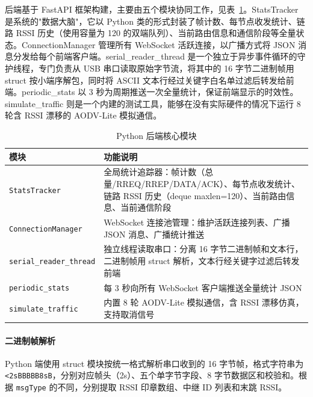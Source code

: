 \documentclass[12pt,a4paper]{ctexart}
\newcommand{\tblheaderstyle}{\sffamily\small\color{white}}
\begin{document}
后端基于 FastAPI 框架构建，主要由五个模块协同工作，见表~\ref{tab:pymodules}。StatsTracker 是系统的"数据大脑"，它以 Python 类的形式封装了帧计数、每节点收发统计、链路 RSSI 历史（使用容量为 120 的双端队列）、当前路由信息和通信阶段等全量状态。ConnectionManager 管理所有 WebSocket 活跃连接，以广播方式将 JSON 消息分发给每个前端客户端。serial\_reader\_thread 是一个独立于异步事件循环的守护线程，专门负责从 USB 串口读取原始字节流，将其中的 16 字节二进制帧用 struct 按小端序解包，同时将 ASCII 文本行经过关键字白名单过滤后转发给前端。periodic\_stats 以 3 秒为周期推送一次全量统计，保证前端显示的时效性。simulate\_traffic 则是一个内建的测试工具，能够在没有实际硬件的情况下运行 8 轮含 RSSI 漂移的 AODV-Lite 模拟通信。

\begin{table}[htbp]
\centering
\caption{Python 后端核心模块}
\label{tab:pymodules}
\begin{tabularx}{\textwidth}{l >{\raggedright\arraybackslash}X}
\toprule
\rowcolor{tblhead}\tblheaderstyle 模块 & \tblheaderstyle 功能说明 \\
\midrule
\texttt{StatsTracker} &
全局统计追踪器：帧计数（总量/RREQ/RREP/DATA/ACK）、每节点收发统计、链路 RSSI 历史（deque maxlen=120）、当前路由信息、当前通信阶段 \\

\texttt{ConnectionManager} &
WebSocket 连接池管理：维护活跃连接列表、广播 JSON 消息、广播统计推送 \\

\texttt{serial\_reader\_thread} &
独立线程读取串口：分离 16 字节二进制帧和文本行，二进制帧用 struct 解析，文本行经关键字过滤后转发前端 \\

\texttt{periodic\_stats} &
每 3 秒向所有 WebSocket 客户端推送全量统计 JSON \\

\texttt{simulate\_traffic} &
内置 8 轮 AODV-Lite 模拟通信，含 RSSI 漂移仿真，支持取消信号 \\
\bottomrule
\end{tabularx}
\end{table}

\paragraph{二进制帧解析}
Python 端使用 struct 模块按统一格式解析串口收到的 16 字节帧，格式字符串为 \texttt{<2sBBBBB8sB}，分别对应帧头（2s）、五个单字节字段、8 字节数据区和校验和。根据 \texttt{msgType} 的不同，分别提取 RSSI 印章数组、中继 ID 列表和末跳 RSSI。
\end{document}
